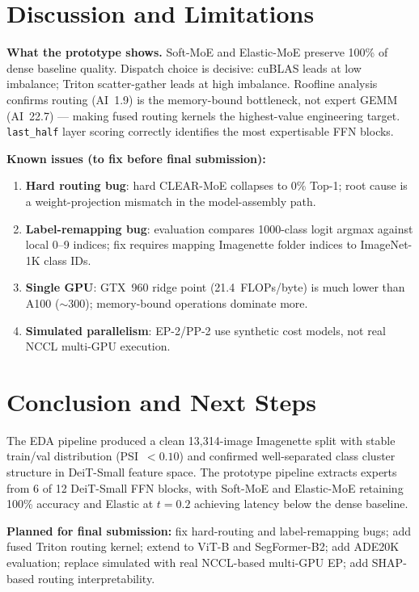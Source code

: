 \documentclass[conference]{IEEEtran}
\begin{document}
\section{Discussion and Limitations}
\label{sec:discussion}

\textbf{What the prototype shows.}
Soft-MoE and Elastic-MoE preserve 100\% of dense baseline quality.
Dispatch choice is decisive: cuBLAS leads at low imbalance; Triton
scatter-gather leads at high imbalance.
Roofline analysis confirms routing (AI~1.9) is the memory-bound
bottleneck, not expert GEMM (AI~22.7) --- making fused routing kernels
the highest-value engineering target.
\texttt{last\_half} layer scoring correctly identifies the most
expertisable FFN blocks.

\textbf{Known issues (to fix before final submission):}
\begin{enumerate}[leftmargin=*,noitemsep]
\item \textbf{Hard routing bug}: hard CLEAR-MoE collapses to 0\% Top-1;
  root cause is a weight-projection mismatch in the model-assembly path.
\item \textbf{Label-remapping bug}: evaluation compares 1000-class logit
  argmax against local 0--9 indices; fix requires mapping Imagenette
  folder indices to ImageNet-1K class IDs.
\item \textbf{Single GPU}: GTX~960 ridge point (21.4~FLOPs/byte) is much
  lower than A100 ($\sim$300); memory-bound operations dominate more.
\item \textbf{Simulated parallelism}: EP-2/PP-2 use synthetic cost models,
  not real NCCL multi-GPU execution.
\end{enumerate}

\section{Conclusion and Next Steps}
\label{sec:conclusion}

The EDA pipeline produced a clean 13,314-image Imagenette split with
stable train/val distribution (PSI~$<0.10$) and confirmed well-separated
class cluster structure in DeiT-Small feature space.
The prototype pipeline extracts experts from 6 of 12 DeiT-Small FFN blocks,
with Soft-MoE and Elastic-MoE retaining 100\% accuracy and Elastic at
$t{=}0.2$ achieving latency below the dense baseline.

\textbf{Planned for final submission:}
fix hard-routing and label-remapping bugs;
add fused Triton routing kernel;
extend to ViT-B and SegFormer-B2;
add ADE20K evaluation;
replace simulated with real NCCL-based multi-GPU EP;
add SHAP-based routing interpretability.

\balance
\end{document}
